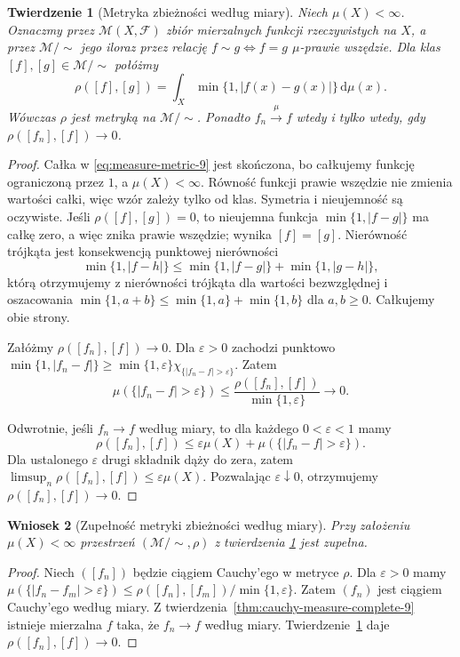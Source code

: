 \documentclass[11pt,a4paper,oneside]{book}
\numberwithin{equation}{chapter}
\theoremstyle{plain}
\newtheorem{twierdzenie}{Twierdzenie}[chapter]
\newtheorem{wniosek}[twierdzenie]{Wniosek}
\theoremstyle{definition}
\theoremstyle{remark}
\begin{document}
\begin{twierdzenie}[Metryka zbieżności według miary]
\label{thm:measure-metric-9}
Niech $\mu(X)<\infty$. Oznaczmy przez
$\mathcal M(X,\mathcal F)$ zbiór mierzalnych funkcji
rzeczywistych na $X$, a przez $\mathcal M/\!\sim$
jego iloraz przez relację
$f\sim g\Longleftrightarrow f=g$ $\mu$-prawie wszędzie.
Dla klas $[f],[g]\in\mathcal M/\!\sim$ połóżmy
\begin{equation}\label{eq:measure-metric-9}
\rho([f],[g])=
\int_X\min\{1,|f(x)-g(x)|\}\,\mathrm d\mu(x).
\end{equation}
Wówczas $\rho$ jest metryką na $\mathcal M/\!\sim$.
Ponadto $f_n\xrightarrow{\mu}f$ wtedy i tylko wtedy,
gdy $\rho([f_n],[f])\to0$.
\end{twierdzenie}
\begin{proof}
Całka w \eqref{eq:measure-metric-9} jest skończona,
bo całkujemy funkcję ograniczoną przez $1$,
a $\mu(X)<\infty$. Równość funkcji prawie
wszędzie nie zmienia wartości całki, więc wzór
zależy tylko od klas. Symetria i nieujemność
są oczywiste. Jeśli $\rho([f],[g])=0$, to
nieujemna funkcja $\min\{1,|f-g|\}$ ma całkę
zero, a więc znika prawie wszędzie; wynika
$[f]=[g]$. Nierówność trójkąta jest konsekwencją
punktowej nierówności
\[
\min\{1,|f-h|\}\le
\min\{1,|f-g|\}+\min\{1,|g-h|\},
\]
którą otrzymujemy z nierówności trójkąta dla
wartości bezwzględnej i oszacowania
$\min\{1,a+b\}\le\min\{1,a\}+\min\{1,b\}$
dla $a,b\ge0$. Całkujemy obie strony.

Załóżmy $\rho([f_n],[f])\to0$. Dla $\varepsilon>0$
zachodzi punktowo
$\min\{1,|f_n-f|\}\ge
\min\{1,\varepsilon\}\chi_{\{|f_n-f|>\varepsilon\}}$.
Zatem
\[
\mu(\{|f_n-f|>\varepsilon\})\le
\frac{\rho([f_n],[f])}{\min\{1,\varepsilon\}}
\longrightarrow0.
\]

Odwrotnie, jeśli $f_n\to f$ według miary,
to dla każdego $0<\varepsilon<1$ mamy
\[
\rho([f_n],[f])\le\varepsilon\mu(X)+
\mu(\{|f_n-f|>\varepsilon\}).
\]
Dla ustalonego $\varepsilon$ drugi składnik
dąży do zera, zatem
$\limsup_n\rho([f_n],[f])\le\varepsilon\mu(X)$.
Pozwalając $\varepsilon\downarrow0$, otrzymujemy
$\rho([f_n],[f])\to0$.
\end{proof}

\begin{wniosek}[Zupełność metryki zbieżności według miary]
\label{cor:measure-metric-complete-9}
Przy założeniu $\mu(X)<\infty$ przestrzeń
$(\mathcal M/\!\sim,\rho)$ z twierdzenia
\ref{thm:measure-metric-9} jest zupełna.
\end{wniosek}
\begin{proof}
Niech $([f_n])$ będzie ciągiem Cauchy'ego w metryce
$\rho$. Dla $\varepsilon>0$ mamy
$\mu(\{|f_n-f_m|>\varepsilon\})\le
\rho([f_n],[f_m])/\min\{1,\varepsilon\}$.
Zatem $(f_n)$ jest ciągiem Cauchy'ego według miary.
Z twierdzenia~\ref{thm:cauchy-measure-complete-9}
istnieje mierzalna $f$ taka, że $f_n\to f$
według miary. Twierdzenie~\ref{thm:measure-metric-9}
daje $\rho([f_n],[f])\to0$.
\end{proof}
\end{document}
